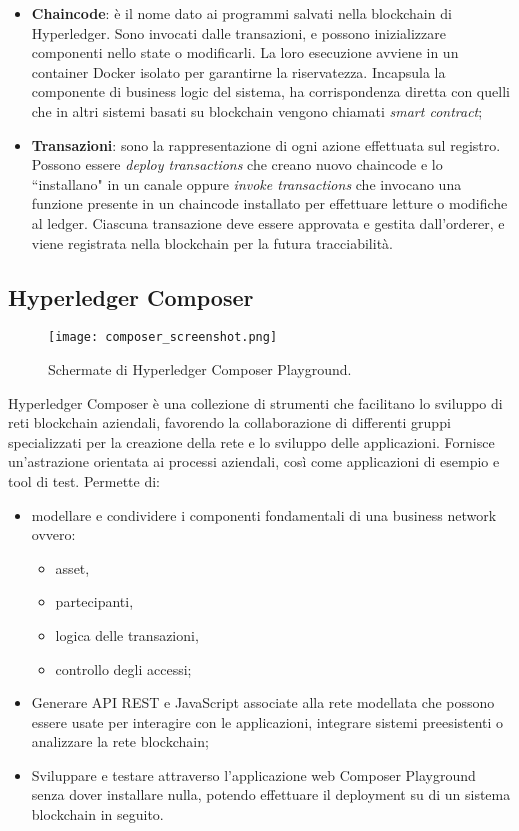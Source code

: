 \begin{itemize}
				\item \textbf{Chaincode}: è il nome dato ai programmi salvati nella blockchain di Hyperledger. Sono invocati dalle transazioni, e possono inizializzare componenti nello state o modificarli. La loro esecuzione avviene in un container Docker isolato per garantirne la riservatezza. Incapsula la componente di business logic del sistema, ha corrispondenza diretta con quelli che in altri sistemi basati su blockchain vengono chiamati \emph{smart contract};
				\item \textbf{Transazioni}: sono la rappresentazione di ogni azione effettuata sul registro. Possono essere \emph{deploy transactions} che creano nuovo chaincode e lo ``installano" in un canale oppure \emph{invoke transactions} che invocano una funzione presente in un chaincode installato per effettuare letture o modifiche al ledger. Ciascuna transazione deve essere approvata e gestita dall'orderer, e viene registrata nella blockchain per la futura tracciabilità.
			\end{itemize}
		
	\subsection{Hyperledger Composer}
		\begin{figure}[!ht]
			\centering
			\texttt{[image: composer\_screenshot.png]}
			\caption[Schermate di Hyperledger Composer Playground]{Schermate di Hyperledger Composer Playground.}
			\label{fig:composer_screenshot}
		\end{figure}
		Hyperledger Composer è una collezione di strumenti che facilitano lo sviluppo di reti blockchain aziendali, favorendo la collaborazione di differenti gruppi specializzati per la creazione della rete e lo sviluppo delle applicazioni. Fornisce un'astrazione orientata ai processi aziendali, così come applicazioni di esempio e tool di test. Permette di:
		\begin{itemize}
			\item modellare e condividere i componenti fondamentali di una business network ovvero:
				\begin{itemize}
					\item asset,
					\item partecipanti,
					\item logica delle transazioni,
					\item controllo degli accessi;
				\end{itemize}
			\item Generare API REST e JavaScript associate alla rete modellata che possono essere usate per interagire con le applicazioni, integrare sistemi preesistenti o analizzare la rete blockchain;
			\item Sviluppare e testare attraverso l'applicazione web Composer Playground senza dover installare nulla, potendo effettuare il deployment su di un sistema blockchain in seguito.
		\end{itemize} 
		
